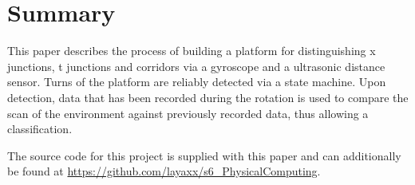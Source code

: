 \section{Summary}
\label{sec:summary}

This paper describes the process of building a platform for distinguishing x junctions, t junctions and corridors via a gyroscope and a ultrasonic distance sensor.
Turns of the platform are reliably detected via a state machine.
Upon detection, data that has been recorded during the rotation is used to compare the scan of the environment against previously recorded data, thus allowing a classification.

The source code for this project is supplied with this paper and can additionally be found at \url{https://github.com/layaxx/s6_PhysicalComputing}.